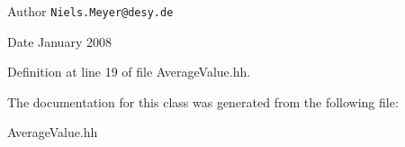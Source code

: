 \begin{DoxyAuthor}{Author}
{\tt Niels.\-Meyer@desy.\-de} 
\end{DoxyAuthor}
\begin{DoxyDate}{Date}
January 2008 
\end{DoxyDate}


Definition at line 19 of file Average\-Value.\-hh.



The documentation for this class was generated from the following file\-:\begin{DoxyCompactItemize}
\item 
Average\-Value.\-hh\end{DoxyCompactItemize}
